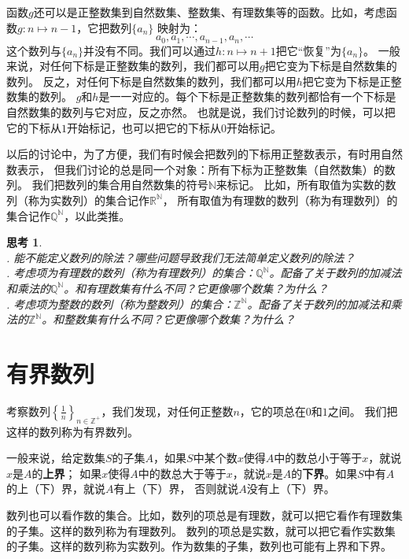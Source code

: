 \documentclass[12pt,UTF8]{ctexbook}
\newtheorem{sk}{思考}[section]
\begin{document}
函数$g$还可以是正整数集到自然数集、整数集、有理数集等的函数。比如，考虑函数$g:n\mapsto n-1$，它把数列$\{a_n\}$
映射为：
$$ a_0, a_1, \cdots, a_{n-1}, a_n,\cdots$$
这个数列与$\{a_n\}$并没有不同。我们可以通过$h:n\mapsto n+1$把它“恢复”为$\{a_n\}$。
一般来说，对任何下标是正整数集的数列，我们都可以用$g$把它变为下标是自然数集的数列。
反之，对任何下标是自然数集的数列，我们都可以用$h$把它变为下标是正整数集的数列。
$g$和$h$是一一对应的。每个下标是正整数集的数列都恰有一个下标是自然数集的数列与它对应，反之亦然。
也就是说，我们讨论数列的时候，可以把它的下标从$1$开始标记，也可以把它的下标从$0$开始标记。

以后的讨论中，为了方便，我们有时候会把数列的下标用正整数表示，有时用自然数表示，
但我们讨论的总是同一个对象：所有下标为正整数集（自然数集）的数列。
我们把数列的集合用自然数集的符号$\mathbb{N}$来标记。
比如，所有取值为实数的数列（称为实数列）的集合记作$\mathbb{R}^\mathbb{N}$，
所有取值为有理数的数列（称为有理数列）的集合记作$\mathbb{Q}^\mathbb{N}$，以此类推。

\begin{sk}
    \mbox{} \\
    . 能不能定义数列的除法？哪些问题导致我们无法简单定义数列的除法？\\
    . 考虑项为有理数的数列（称为有理数列）的集合：$\mathbb{Q}^{\mathbb{N}}$。配备了关于数列的加减法和乘法的$\mathbb{Q}^{\mathbb{N}}$。和有理数集有什么不同？它更像哪个数集？为什么？\\
    . 考虑项为整数的数列（称为整数列）的集合：$\mathbb{Z}^{\mathbb{N}}$。配备了关于数列的加减法和乘法的$\mathbb{Z}^{\mathbb{N}}$。和整数集有什么不同？它更像哪个数集？为什么？
\end{sk}

\section{有界数列}
考察数列$\left\{\frac{1}{n}\right\}_{n\in\mathbb{Z}^+}$，我们发现，对任何正整数$n$，它的项总在$0$和$1$之间。
我们把这样的数列称为有界数列。

一般来说，给定数集$S$的子集$A$，如果$S$中某个数$x$使得$A$中的数总小于等于$x$，就说$x$是$A$的\textbf{上界}；
如果$x$使得$A$中的数总大于等于$x$，就说$x$是$A$的\textbf{下界}。如果$S$中有$A$的上（下）界，就说$A$有上（下）界，
否则就说$A$没有上（下）界。

数列也可以看作数的集合。比如，数列的项总是有理数，就可以把它看作有理数集的子集。这样的数列称为有理数列。
数列的项总是实数，就可以把它看作实数集的子集。这样的数列称为实数列。作为数集的子集，数列也可能有上界和下界。
\end{document}
